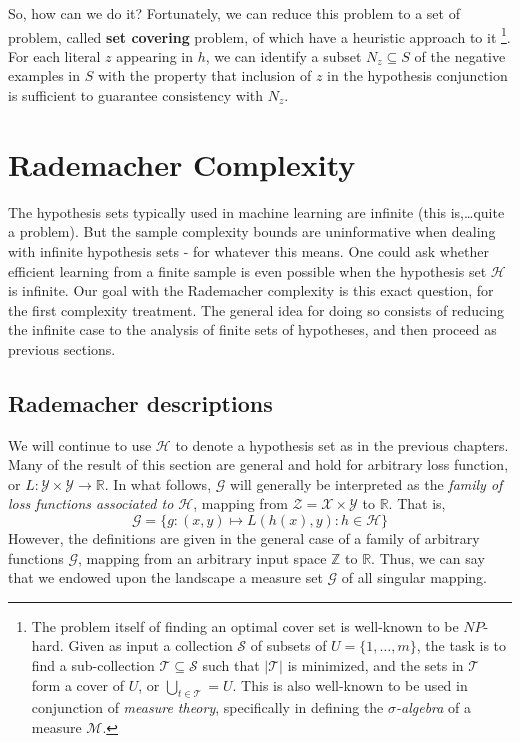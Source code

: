 So, how can we do it? Fortunately, we can reduce this problem to a set of problem, called \textbf{set covering} problem, of which have a heuristic approach to it \footnote{The problem itself of finding an optimal cover set is well-known to be $NP$-hard. Given as input a collection $\mathcal{S}$ of subsets of $U=\{1,\dots,m\}$, the task is to find a sub-collection $\mathcal{T}\subseteq \mathcal{S}$ such that $\lvert \mathcal{T}\rvert$ is minimized, and the sets in $\mathcal{T}$ form a cover of $U$, or $\bigcup_{t\in\mathcal{T}}=U$. This is also well-known to be used in conjunction of \textit{measure theory}, specifically in defining the \textit{$\sigma$-algebra} of a measure $\mathcal{M}$.}. For each literal $z$ appearing in $h$, we can identify a subset $N_{z}\subseteq S$ of the negative examples in $S$ with the property that inclusion of $z$ in the hypothesis conjunction is sufficient to guarantee consistency with $N_{z}$. 



\section{Rademacher Complexity}
The hypothesis sets typically used in machine learning are infinite (this is,\dots quite a problem). But the sample complexity bounds are uninformative when dealing with infinite hypothesis sets - for whatever this means. One could ask whether efficient learning from a finite sample is even possible when the hypothesis set $\mathcal{H}$ is infinite. Our goal with the Rademacher complexity is this exact question, for the first complexity treatment. The general idea for doing so consists of reducing the infinite case to the analysis of finite sets of hypotheses, and then proceed as previous sections. 
\subsection{Rademacher descriptions}
We will continue to use $\mathcal{H}$ to denote a hypothesis set as in the previous chapters. Many of the result of this section are general and hold for arbitrary loss function, or $L: \mathcal{Y}\times \mathcal{Y}\to \mathbb{R}$. In what follows, $\mathcal{G}$ will generally be interpreted as the \textit{family of loss functions associated to $\mathcal{H}$}, mapping from $\mathcal{Z}=\mathcal{X}\times\mathcal{Y}$ to $\mathbb{R}$. That is, \begin{equation*}
    \mathcal{G} = \{g: (x,y)\mapsto L(h(x),y): h\in \mathcal{H}\}
\end{equation*}
However, the definitions are given in the general case of a family of arbitrary functions $\mathcal{G}$, mapping from an arbitrary input space $\mathbb{Z}$ to $\mathbb{R}$. Thus, we can say that we endowed upon the landscape a measure set $\mathcal{G}$ of all singular mapping. 

